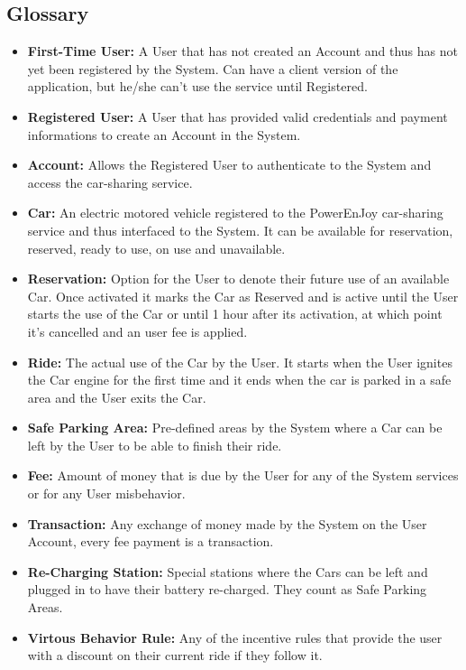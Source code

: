 \documentclass[a4paper]{article}
\begin{document}
\subsection{Glossary}
\begin{itemize}
\item \textbf{First-Time User:} A User that has not created an Account and thus has not yet been registered by the System. Can have a client version of the application, but he/she can't use the service until Registered.
\item \textbf{Registered User:} A User that has provided valid credentials and payment informations to create an Account in the System.
\item \textbf{Account:} Allows the Registered User to authenticate to the System and access the car-sharing service.
\item \textbf{Car:} An electric motored vehicle registered to the PowerEnJoy car-sharing service and thus interfaced to the System. It can be available for reservation, reserved, ready to use, on use and unavailable.
\item \textbf{Reservation:} Option for the User to denote their future use of an available Car. Once activated it marks the Car as Reserved and is active until the User starts the use of the Car or until 1 hour after its activation, at which point it's cancelled and an user fee is applied.
\item \textbf{Ride:} The actual use of the Car by the User. It starts when the User ignites the Car engine for the first time and it ends when the car is parked in a safe area and the User exits the Car.
\item \textbf{Safe Parking Area:} Pre-defined areas by the System where a Car can be left by the User to be able to finish their ride.
\item \textbf{Fee:} Amount of money that is due by the User for any of the System services or for any User misbehavior.
\item \textbf{Transaction:} Any exchange of money made by the System on the User Account, every fee payment is a transaction.
\item \textbf{Re-Charging Station:} Special stations where the Cars can be left and plugged in to have their battery re-charged. They count as Safe Parking Areas.
\item \textbf{Virtous Behavior Rule:} Any of the incentive rules that provide the user with a discount on their current ride if they follow it.
\end{itemize}
\newpage
\end{document}
